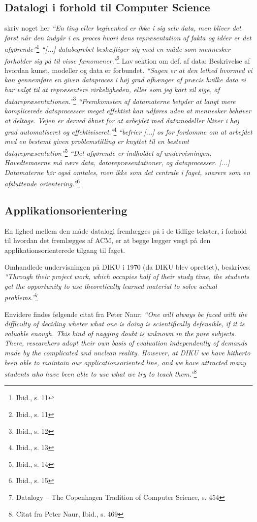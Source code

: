 \documentclass[10pt,a4paper]{article}
\newcommand{\citat}[2]{\vspace{0.1cm}\newline\textit{``#1''}\hspace{0.1cm}\footnote{#2}\vspace{0.1cm}\newline}
\begin{document}
\subsection{Datalogi i forhold til Computer Science}
skriv noget her \citat{En ting eller begivenhed er ikke i sig selv data, men
    bliver det først når den indgår i en proces hvori dens repræsentation af
    fakta og idéer er det afgørende}{Ibid., s. 11} \citat{[...] databegrebet
    beskæftiger sig med en måde som mennesker forholder sig på til visse
    fænomener.}{Ibid., s. 11} Lav sektion om def. af data: Beskrivelse af hvordan
kunst, modeller og data er forbundet.  \citat{Sagen er at den lethed hvormed vi
    kan gennemføre en given dataproces i høj grad afhænger af præcis hvilke data
    vi har valgt til at repræsentere virkeligheden, eller som jeg kort vil sige,
    af \emph{datarepræsentationen}.}{Ibid., s. 12} \citat{Fremkomsten af datamaterne
    betyder at langt mere komplicerede dataprocesser meget effektivt kan udføres
    uden at mennesker behøver at deltage. Vejen er derved åbnet for at arbejdet
    med datamodeller bliver i høj grad automatiseret og effektiviseret.}{Ibid., s. 13}
\citat{befrier [...] os for fordomme om at arbejdet med en bestemt given
    problemstilling er knyttet til en bestemt datarepræsentation}{Ibid., s. 14}
\citat{Det afgørende er indholdet af undervisningen. Hovedtemaerne må være data,
    datarepræsentationer, og dataprocesser. [...] Datamaterne bør også omtales,
    men ikke som det centrale i faget, snarere som en afsluttende
    orientering.}{Ibid., s. 15}


\subsection{Applikationsorientering}
En lighed mellem den måde datalogi fremlægges på i de tidlige tekster, i forhold
til hvordan det fremlægges af ACM, er at begge lægger vægt på den
applikationsorienterede tilgang til faget.

Omhandlede undervisningen på DIKU i 1970 (da DIKU blev oprettet), beskrives:
\citat{Through their project work, which occupies half of their study time, the
    students get the opportunity to use theoretically learned material to solve
    actual problems.}{Datalogy -- The Copenhagen Tradition of Computer
    Science, s. 454}

Envidere findes følgende citat fra Peter Naur: \citat{One will always be faced
    with the difficulty of deciding wheter what one is doing is scientifically
    defensible, if it is valuable enough. This kind of nagging doubt is unknown
    in the pure subjects. There, researchers adopt their own basis of evaluation
    independently of demands made by the complicated and unclean reality.
    However, at DIKU we have hitherto been able to maintain our
    applicationsoriented line, and we have attracted many students who have been
    able to use what we try to teach them.}{Citat fra Peter Naur, Ibid., s. 469}
\end{document}
